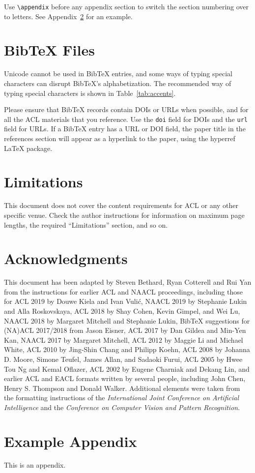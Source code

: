 \documentclass[11pt]{article}
\begin{document}
Use \verb|\appendix| before any appendix section to switch the section numbering over to letters. See Appendix~\ref{sec:appendix} for an example.

\section{Bib\TeX{} Files}
\label{sec:bibtex}

Unicode cannot be used in Bib\TeX{} entries, and some ways of typing special characters can disrupt Bib\TeX's alphabetization. The recommended way of typing special characters is shown in Table~\ref{tab:accents}.

Please ensure that Bib\TeX{} records contain DOIs or URLs when possible, and for all the ACL materials that you reference.
Use the \verb|doi| field for DOIs and the \verb|url| field for URLs.
If a Bib\TeX{} entry has a URL or DOI field, the paper title in the references section will appear as a hyperlink to the paper, using the hyperref \LaTeX{} package.

\section*{Limitations}

This document does not cover the content requirements for ACL or any
other specific venue.  Check the author instructions for
information on
maximum page lengths, the required ``Limitations'' section,
and so on.

\section*{Acknowledgments}

This document has been adapted
by Steven Bethard, Ryan Cotterell and Rui Yan
from the instructions for earlier ACL and NAACL proceedings, including those for
ACL 2019 by Douwe Kiela and Ivan Vuli\'{c},
NAACL 2019 by Stephanie Lukin and Alla Roskovskaya,
ACL 2018 by Shay Cohen, Kevin Gimpel, and Wei Lu,
NAACL 2018 by Margaret Mitchell and Stephanie Lukin,
Bib\TeX{} suggestions for (NA)ACL 2017/2018 from Jason Eisner,
ACL 2017 by Dan Gildea and Min-Yen Kan,
NAACL 2017 by Margaret Mitchell,
ACL 2012 by Maggie Li and Michael White,
ACL 2010 by Jing-Shin Chang and Philipp Koehn,
ACL 2008 by Johanna D. Moore, Simone Teufel, James Allan, and Sadaoki Furui,
ACL 2005 by Hwee Tou Ng and Kemal Oflazer,
ACL 2002 by Eugene Charniak and Dekang Lin,
and earlier ACL and EACL formats written by several people, including
John Chen, Henry S. Thompson and Donald Walker.
Additional elements were taken from the formatting instructions of the \emph{International Joint Conference on Artificial Intelligence} and the \emph{Conference on Computer Vision and Pattern Recognition}.

%


\appendix

\section{Example Appendix}
\label{sec:appendix}

This is an appendix.
\end{document}
